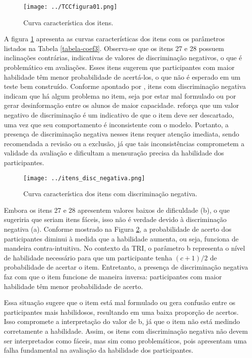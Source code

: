\begin{figure}[!htb]
	\centering
	\texttt{[image: ../TCCfigura01.png]}
	\caption{Curva característica dos itens.}
	\label{fig:curva_itens}
\end{figure}

A figura \ref{fig:curva_itens} apresenta as curvas características dos itens com os parâmetros listados na Tabela \ref{tabela-coef3}. Observa-se que os itens 27 e 28 possuem inclinações contrárias, indicativas de valores de discriminação negativos, o que é problemático em avaliações. Esses itens sugerem que participantes com maior habilidade têm menor probabilidade de acertá-los, o que não é esperado em um teste bem construído. Conforme apontado por , itens com discriminação negativa indicam que há algum problema no item, seja por estar mal formulado ou por gerar desinformação entre os alunos de maior capacidade.  reforça que um valor negativo de discriminação é um indicativo de que o item deve ser descartado, uma vez que seu comportamento é inconsistente com o modelo. Portanto, a presença de discriminação negativa nesses itens requer atenção imediata, sendo recomendada a revisão ou a exclusão, já que tais inconsistências comprometem a validade da avaliação e dificultam a mensuração precisa da habilidade dos participantes.


\begin{figure}[hb]
	\centering
	\texttt{[image: ../itens\_disc\_negativa.png]}
	\caption{Curva característica dos itens com discriminação negativa.}
	\label{fig:itens_disc_negativa}
\end{figure}


Embora os itens 27 e 28 apresentem valores baixos de dificuldade (b), o que sugeriria que seriam itens fáceis, isso não é verdade devido à discriminação negativa (a). Conforme mostrado na Figura \ref{fig:itens_disc_negativa}, a probabilidade de acerto dos participantes diminui à medida que a habilidade aumenta, ou seja, funciona de mandeira contra-intuitiva. No contexto da TRI, o parâmetro b representa o nível de habilidade necessário para que um participante tenha $(c+1)/2$ de probabilidade de acertar o item. Entretanto, a presença de discriminação negativa faz com que o item funcione de maneira inversa: participantes com maior habilidade têm menor probabilidade de acerto.

Essa situação sugere que o item está mal formulado ou gera confusão entre os participantes mais habilidosos, resultando em uma baixa proporção de acertos. Isso compromete a interpretação do valor de b, já que o item não está medindo corretamente a habilidade. Assim, os itens com discriminação negativa não devem ser interpretados como fáceis, mas sim como problemáticos, pois apresentam uma falha fundamental na avaliação da habilidade dos participantes.

